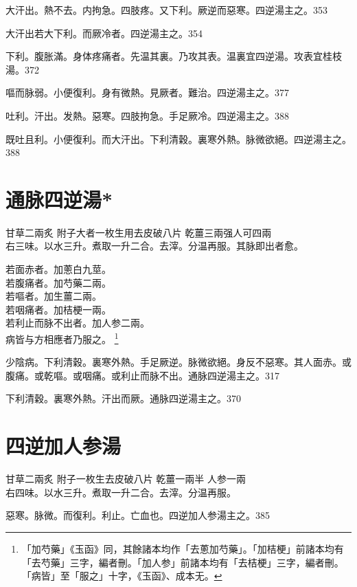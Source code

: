 大汗出。熱不去。内拘急。四肢疼。{\khaai 又}下利。厥逆而惡寒。四逆湯主之。353

大汗{\khaai 出}若大下利。而厥冷者。四逆湯主之。354

下利。腹{\khaai 胀}滿。身体疼痛者。先温其裏。乃攻其表。温裏宜四逆湯。攻表宜桂枝湯。372

嘔而脉弱。小便復利。身有微熱。見厥者。難治。四逆湯主之。377

吐利。汗出。发熱。惡寒。四肢拘急。手足厥冷。四逆湯主之。388

既吐且利。小便復利。而大汗出。下利清穀。裏寒外熱。脉微欲絕。四逆湯主之。388

\section{通脉四逆湯*}

甘草{\scriptsize 二兩炙} 附子{\scriptsize 大者一枚生用去皮破八片} 乾薑{\scriptsize 三兩强人可四兩}\\
右三味。以水三升。煮取一升二合。去滓。分温再服。其脉即出者愈。

{\khaai 若}面赤者。加蔥{\khaai 白}九莖。\\
{\khaai 若}腹痛者。加芍藥二兩。\\
{\khaai 若}嘔者。加生薑二兩。\\
{\khaai 若}咽痛者。加桔梗一兩。\\
{\khaai 若}利止而脉不出者。加人参二兩。\\
{\khaai 病皆与方相應者乃服之。}
	\footnote{
		「加芍藥」《玉函》同，其餘諸本均作「去蔥加芍藥」。「加桔梗」前諸本均有「去芍藥」三字，編者刪。「加人参」前諸本均有「去桔梗」三字，編者刪。「病皆」至「服之」十字，《玉函》、成本无。
	}

少陰病。下利清穀。裏寒外熱。手足厥逆。脉微欲絕。身反不惡寒。其人面赤。或腹痛。或乾嘔。或咽痛。或利止而脉不出。通脉四逆湯主之。317

下利清穀。裏寒外熱。汗出而厥。通脉四逆湯主之。370

\section{四逆加人参湯}

甘草{\scriptsize 二兩炙} 附子{\scriptsize 一枚生去皮破八片} 乾薑{\scriptsize 一兩半} 人参{\scriptsize 一兩}\\
右四味。以水三升。煮取一升二合。去滓。分温再服。

惡寒。脉微。而復利。利止。亡血也。四逆加人参湯主之。385


